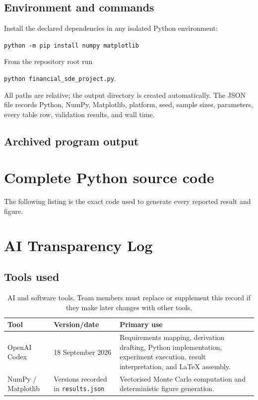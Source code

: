 \documentclass[11pt,a4paper]{article}
\theoremstyle{definition}
\theoremstyle{remark}
\begin{document}
\subsection{Environment and commands}
Install the declared dependencies in any isolated Python environment:
\begin{center}
\texttt{python -m pip install numpy matplotlib}
\end{center}
From the repository root run
\begin{center}
\texttt{python financial\_sde\_project.py}.
\end{center}
All paths are relative; the output directory is created automatically.  The
JSON file records Python, NumPy, Matplotlib, platform, seed, sample sizes,
parameters, every table row, validation results, and wall time.

\subsection{Archived program output}


\section{Complete Python source code}
The following listing is the exact code used to generate every reported result
and figure.

\section{AI Transparency Log}
\subsection{Tools used}
\begin{table}[H]
\centering
\small
\begin{tabular}{p{}p{}p{}}
\toprule
Tool & Version/date & Primary use\\
\midrule
OpenAI Codex & 18 September 2026 & Requirements mapping, derivation drafting,
Python implementation, experiment execution, result interpretation, and
LaTeX assembly.\\
NumPy / Matplotlib & Versions recorded in \texttt{results.json} & Vectorised
Monte Carlo computation and deterministic figure generation.\\
\bottomrule
\end{tabular}
\caption{AI and software tools.  Team members must replace or supplement this
record if they make later changes with other tools.}
\end{table}
\end{document}
